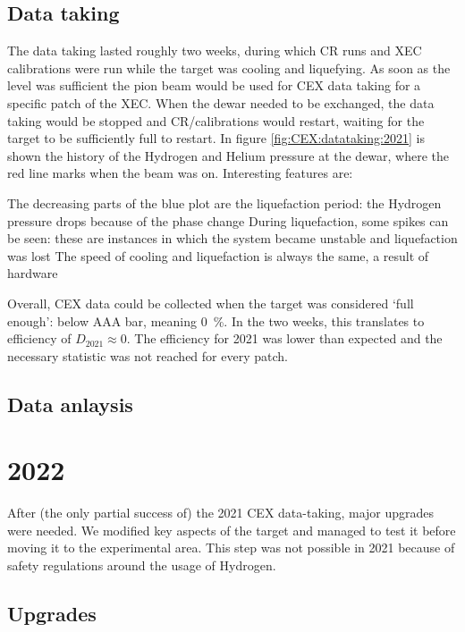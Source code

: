 \begin{refsection}
    \subsection{Data taking}
        The data taking lasted roughly two weeks, during which CR runs and XEC calibrations were run while the target was cooling and liquefying. 
        As soon as the level was sufficient the pion beam would be used for CEX data taking for a specific patch of the XEC.  
        When the dewar needed to be exchanged, the data taking would be stopped and CR/calibrations would restart, waiting for the target to be sufficiently full to restart.
        \noindent
        In figure \ref{fig:CEX:datataking:2021} is shown the history of the Hydrogen and Helium pressure at the dewar, where the red line marks when the beam was on. 
        Interesting features are:
        \begin{outline}
            \1 The decreasing parts of the blue plot are the liquefaction period: the Hydrogen pressure drops because of the phase change
            \1 During liquefaction, some spikes can be seen: these are instances in which the system became unstable and liquefaction was lost
            \1 The speed of cooling and liquefaction is always the same, a result of hardware 
        \end{outline}
        Overall, CEX data could be collected when the target was considered `full enough': below AAA bar, meaning \SI{0}{\%}. 
        In the two weeks, this translates to efficiency of $D_{2021}\approx0$.
        The efficiency for 2021 was lower than expected and the necessary statistic was not reached for every patch.
    
    \subsection{Data anlaysis}

\section{2022}
    After (the only partial success of) the 2021 CEX data-taking, major upgrades were needed.
    We modified key aspects of the target and managed to test it before moving it to the experimental area.
    This step was not possible in 2021 because of safety regulations around the usage of Hydrogen.

    \subsection{Upgrades}

\end{refsection}
